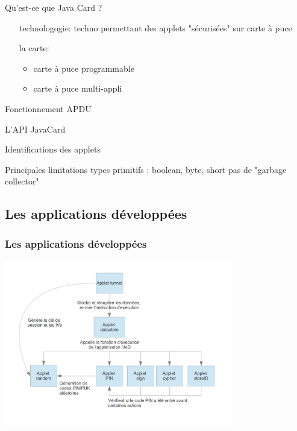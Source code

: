 \documentclass{beamer}
\begin{document}
\begin{frame}
    \begin{block}{Qu'est-ce que Java Card ?}
        \begin{itemize}
            \item[technologogie: ] techno permettant des applets "sécurisées"  sur carte à puce 

            \item[la carte: ]
                \begin{itemize}
                    \item carte à puce programmable 
                    \item carte à puce multi-appli
                \end{itemize}
        \end{itemize}
    \end{block}
\end{frame}

\begin{frame}
    \begin{block}{Fonctionnement}
        APDU


        L'API JavaCard
            


        Identifications des applets
    \end{block}
\end{frame}

\begin{frame}
    \begin{block}{Principales limitations}
        types primitifs : boolean, byte, short
        pas de "garbage collector"

    \end{block}
\end{frame}

\subsection{Les applications développées}
\begin{frame}
    \frametitle{Les applications développées}
 \includegraphics[width=10cm]{graphe_dep}
    \begin{block}{}
    \end{block}
\end{frame}
\end{document}
